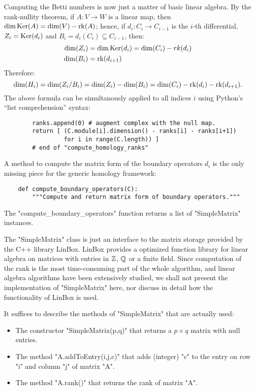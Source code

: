 Computing the Betti numbers is now just a matter of basic linear algebra.
By the rank-nullity theorem, if $A:V\to W$ is a linear map,
then $\dim\operatorname{Ker}(A) =  \dim(V) - \operatorname{rk}(A)$; hence, if $d_i: C_i \to
C_{i-1}$ is the $i$-th differential, $Z_i = \operatorname{Ker}(d_i)$ and $B_i =
d_i(C_i) \subseteq C_{i-1}$, then:
\begin{align*}
  \dim(Z_i) &= \dim\operatorname{Ker}(d_i) = \dim(C_i) - rk(d_i) 
  \\
  \dim(B_i) &= \operatorname{rk}(d_{i+1})
\end{align*}
Therefore:
\begin{equation*}
  \dim(H_i) = \dim(Z_i / B_i) = \dim(Z_i) - \dim(B_i)
            = \dim(C_i) - \operatorname{rk}(d_i) - \operatorname{rk}(d_{i+1}).
\end{equation*}
The above formula can be simultanously applied to all indices $i$
using Python's ``list comprehension'' syntax:
\begin{lstlisting}
        ranks.append(0) # augment complex with the null map.
        return [ (C.module[i].dimension() - ranks[i] - ranks[i+1])
                 for i in range(C.length)) ]
        # end of "compute_homology_ranks"

\end{lstlisting}

A method to compute the matrix form of the boundary operators $d_i$ is
the only missing piece for the generic homology framework:
\begin{lstlisting}
    def compute_boundary_operators(C):
        """Compute and return matrix form of boundary operators."""

\end{lstlisting}
The "compute_boundary_operators" function returns a list of
"SimpleMatrix" instances.  

The "SimpleMatrix" class is just an interface to the matrix storage
provided by the C++ library LinBox.  LinBox provides
a optimized function library for linear algebra on matrices with
entries in $\mathbb{Z}$, $\mathbb{Q}$ or a finite field.  Since computation of
the rank is the most time-consuming part of the whole algorithm, and
linear algebra algorithms have been extensively
studied, we shall not present the implementation of
"SimpleMatrix" here, nor discuss in detail how the functionality of
LinBox is used.  

It suffices to describe the methods of "SimpleMatrix" that are
actually used:
\begin{itemize}
\item The constructor "SimpleMatrix(p,q)" that returns a $p \times q$
  matrix with null entries.
\item The method "A.addToEntry(i,j,c)" that adds (integer) "c" to the
  entry on row "i" and column "j" of matrix "A".
\item The method "A.rank()" that returns the rank of matrix "A".
\end{itemize}

